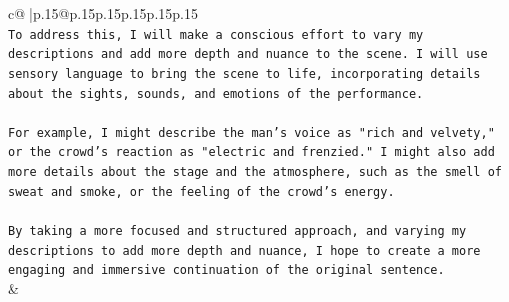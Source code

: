 \documentclass{article}
\begin{document}
{\begin{supertabular}{c@{$\;$}|p{.15\linewidth}@{}p{.15\linewidth}p{.15\linewidth}p{.15\linewidth}p{.15\linewidth}p{.15\linewidth}}
{{{\\ 
\texttt{To address this, I will make a conscious effort to vary my descriptions and add more depth and nuance to the scene. I will use sensory language to bring the scene to life, incorporating details about the sights, sounds, and emotions of the performance.} \\
\\ 
\texttt{For example, I might describe the man's voice as "rich and velvety," or the crowd's reaction as "electric and frenzied." I might also add more details about the stage and the atmosphere, such as the smell of sweat and smoke, or the feeling of the crowd's energy.} \\
\\ 
\texttt{By taking a more focused and structured approach, and varying my descriptions to add more depth and nuance, I hope to create a more engaging and immersive continuation of the original sentence.} \\
            }
        }
    }
    & \\ \\

\end{supertabular}
}
\end{document}

